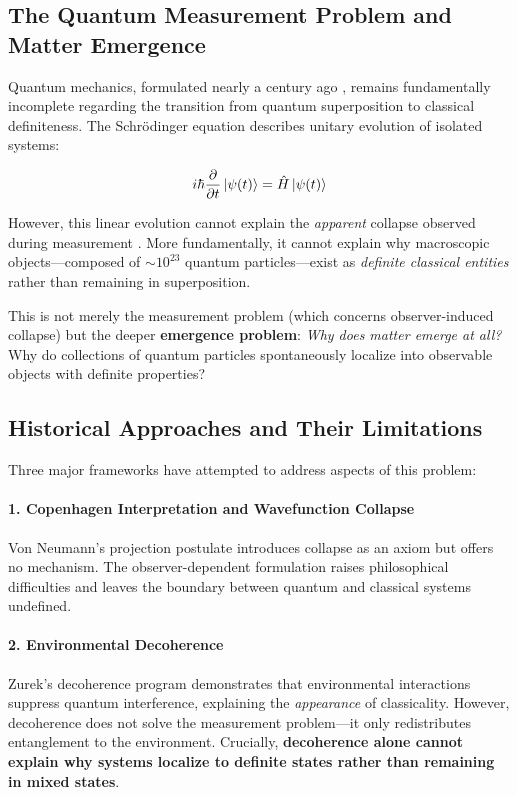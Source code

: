 \documentclass[12pt,a4paper]{article}
\begin{document}
\subsection{The Quantum Measurement Problem and Matter Emergence}

Quantum mechanics, formulated nearly a century ago \citep{schrodinger1935,heisenberg1927}, remains fundamentally incomplete regarding the transition from quantum superposition to classical definiteness. The Schrödinger equation describes unitary evolution of isolated systems:

\begin{equation}
i\hbar \frac{\partial}{\partial t} \ket{\psi(t)} = \hat{H} \ket{\psi(t)}
\label{eq:schrodinger}
\end{equation}

However, this linear evolution cannot explain the \emph{apparent} collapse observed during measurement \citep{vonneumann1932}. More fundamentally, it cannot explain why macroscopic objects---composed of $\sim 10^{23}$ quantum particles---exist as \emph{definite classical entities} rather than remaining in superposition.

This is not merely the measurement problem (which concerns observer-induced collapse) but the deeper \textbf{emergence problem}: \emph{Why does matter emerge at all?} Why do collections of quantum particles spontaneously localize into observable objects with definite properties?

\subsection{Historical Approaches and Their Limitations}

Three major frameworks have attempted to address aspects of this problem:

\paragraph{1. Copenhagen Interpretation and Wavefunction Collapse}
Von Neumann's projection postulate \citep{vonneumann1932} introduces collapse as an axiom but offers no mechanism. The observer-dependent formulation raises philosophical difficulties and leaves the boundary between quantum and classical systems undefined.

\paragraph{2. Environmental Decoherence}
Zurek's decoherence program \citep{zurek2003,joos2003} demonstrates that environmental interactions suppress quantum interference, explaining the \emph{appearance} of classicality. However, decoherence does not solve the measurement problem---it only redistributes entanglement to the environment. Crucially, \textbf{decoherence alone cannot explain why systems localize to definite states rather than remaining in mixed states}.
\end{document}
